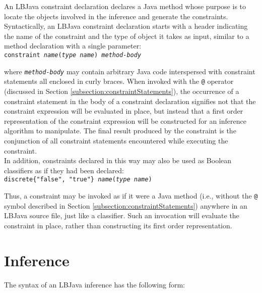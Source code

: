 An LBJava constraint declaration declares a Java method whose purpose is to
locate the objects involved in the inference and generate the constraints.
Syntactically, an LBJava constraint declaration starts with a header indicating
the name of the constraint and the type of object it takes as input, similar
to a method declaration with a single parameter: \\

\vspace{-.25cm}
{\tt constraint \emph{name}(\emph{type name}) \emph{method-body}} \\
\vspace{-.25cm}

\noindent
where {\tt\emph{method-body}} may contain arbitrary Java code interspersed
with constraint statements all enclosed in curly braces.  When invoked with
the {\tt @} operator (discussed in Section
\ref{subsection:constraintStatements}), the occurrence of a constraint
statement in the body of a constraint declaration signifies not that the
constraint expression will be evaluated in place, but instead that a first
order representation of the constraint expression will be constructed for an
inference algorithm to manipulate.  The final result produced by the
constraint is the conjunction of all constraint statements encountered while
executing the constraint. \\

In addition, constraints declared in this way may also be used as Boolean
classifiers as if they had been declared: \\

\vspace{-.25cm}
{\tt discrete\{"false", "true"\} \emph{name}(\emph{type name})} \\
\vspace{-.25cm}

\noindent
Thus, a constraint may be invoked as if it were a Java method (i.e., without
the {\tt @} symbol described in Section \ref{subsection:constraintStatements})
anywhere in an LBJava source file, just like a classifier.  Such an invocation
will evaluate the constraint in place, rather than constructing its first
order representation.

\section{Inference} \label{section:inference}

The syntax of an LBJava inference has the following form: \\

